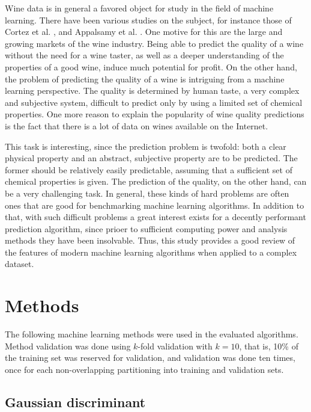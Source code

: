\documentclass[twoside]{article}
\begin{document}
\begin{multicols}{2}
Wine data is in general a favored object for study in the field of machine learning. There have been various studies
on the subject, for instance those of Cortez et al. \cite{WQA}, \cite{CorCer09} 
and Appalsamy et al. \cite{Appalsami}. One motive for this are the large and growing markets of the wine industry.
Being able to predict the quality of a wine without the need for a wine taster, as well as a deeper understanding
of the properties of a good wine, induce much potential for profit. On the other hand, the problem of predicting
the quality of a wine is intriguing from a machine learning perspective. The quality is determined by human taste,
a very complex and subjective system, difficult to predict only by using a limited set of chemical properties.
One more reason to explain the popularity of wine quality predictions is the fact that there is a lot of data
on wines available on the Internet.

This task is interesting, since the prediction problem is twofold: both a clear physical property and an abstract, subjective property
are to be predicted. The former should be relatively easily predictable, assuming that a sufficient set
of chemical properties is given. The prediction of the quality, on the other hand, can be a very challenging task.
In general, these kinds of hard problems are often ones that are good for benchmarking machine learning algorithms.
In addition to that, with such difficult problems a great interest exists for a decently performant prediction algorithm,
since prioer to sufficient computing power and analysis methods they have been insolvable. Thus, this study provides a
good review of the features of modern machine learning algorithms when applied to a complex dataset.
 
\section{Methods}

The following machine learning methods were used in the evaluated algorithms.
Method validation was done using $k$-fold validation with $k = 10$,
that is, 10\% of the training set was reserved for validation, and validation
was done ten times, once for each non-overlapping partitioning into training and validation sets.

\subsection{Gaussian discriminant}


\end{multicols}
\end{document}
